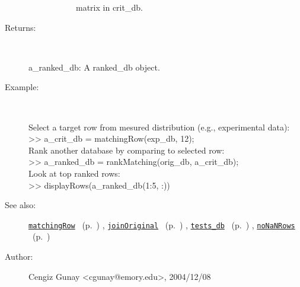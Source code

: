 \begin{description}
\begin{description}
\begin{description}
matrix in crit\_db.
\end{description}%
\end{description}%
%
\item[Returns:
]~

   a\_ranked\_db: A ranked\_db object.
%
\item[Example:]~
\begin{lyxcode} Select a target row from mesured distribution (e.g., experimental data):
\\%
 >> a\_crit\_db = matchingRow(exp\_db, 12);
\\%
 Rank another database by comparing to selected row:
\\%
 >> a\_ranked\_db = rankMatching(orig\_db, a\_crit\_db);
\\%
 Look at top ranked rows:
\\%
 >> displayRows(a\_ranked\_db(1:5, :))
\\%
\end{lyxcode}
%
\item[See also:]%
\hyperlink{ref_matchingRow}{\texttt{matchingRow}}%
\ (p.~\pageref{ref_matchingRow})%
%
, \hyperlink{ref_joinOriginal}{\texttt{joinOriginal}}%
\ (p.~\pageref{ref_joinOriginal})%
%
, \hyperlink{ref_tests_db}{\texttt{tests\_db}}%
\ (p.~\pageref{ref_tests_db})%
%
, \hyperlink{ref_noNaNRows}{\texttt{noNaNRows}}%
\ (p.~\pageref{ref_noNaNRows})%
%
%
\item[Author:]%
Cengiz Gunay <cgunay@emory.edu>, 2004/12/08
%
\end{description}
\methodline%

